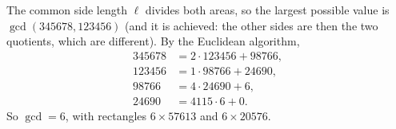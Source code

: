 The common side length $\ell$ divides both areas, so the largest possible value is $\gcd(345678,123456)$ (and it is achieved: the other sides are then the two quotients, which are different). By the Euclidean algorithm,
\begin{align*}
345678&=2\cdot123456+98766,\\
123456&=1\cdot98766+24690,\\
98766&=4\cdot24690+6,\\
24690&=4115\cdot6+0 .
\end{align*}
So $\gcd=\boxed{6}$, with rectangles $6\times57613$ and $6\times20576$.
